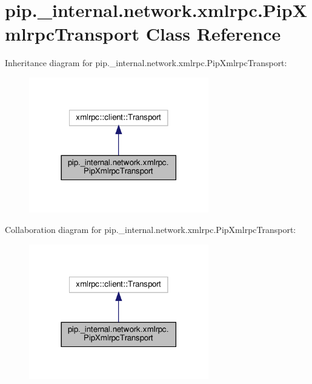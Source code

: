 \hypertarget{classpip_1_1__internal_1_1network_1_1xmlrpc_1_1PipXmlrpcTransport}{}\section{pip.\+\_\+internal.\+network.\+xmlrpc.\+Pip\+Xmlrpc\+Transport Class Reference}
\label{classpip_1_1__internal_1_1network_1_1xmlrpc_1_1PipXmlrpcTransport}


Inheritance diagram for pip.\+\_\+internal.\+network.\+xmlrpc.\+Pip\+Xmlrpc\+Transport\+:
\nopagebreak
\begin{figure}[H]
\begin{center}
\leavevmode
\includegraphics[width=222pt]{classpip_1_1__internal_1_1network_1_1xmlrpc_1_1PipXmlrpcTransport__inherit__graph}
\end{center}
\end{figure}


Collaboration diagram for pip.\+\_\+internal.\+network.\+xmlrpc.\+Pip\+Xmlrpc\+Transport\+:
\nopagebreak
\begin{figure}[H]
\begin{center}
\leavevmode
\includegraphics[width=222pt]{classpip_1_1__internal_1_1network_1_1xmlrpc_1_1PipXmlrpcTransport__coll__graph}
\end{center}
\end{figure}
